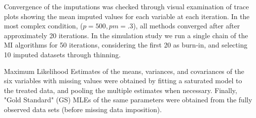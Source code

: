 Convergence of the imputations was checked through visual examination of trace plots showing the mean imputed values
for each variable at each iteration. In the most complex condition, ($p = 500, pm = .3$), all methods converged after 
after approximately 20 iterations. In the simulation study we run a single chain of the MI algorithms for 50 
iterations, considering the first 20 as burn-in, and selecting 10 imputed datasets through thinning.

Maximum Likelihood Estimates of the means, variances, and covariances of the six variables with missing values  
were obtained by fitting a saturated model to the treated data, and pooling the multiple estimates when necessary. 
Finally, "Gold Standard" (GS) MLEs of the same parameters were obtained from the fully observed data sets (before missing data imposition).
